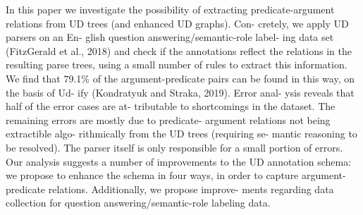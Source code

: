 In this paper we investigate the possibility of extracting predicate-argument relations from UD trees (and enhanced UD graphs). Con- cretely, we apply UD parsers on an En- glish question answering/semantic-role label- ing data set (FitzGerald et al., 2018) and check if the annotations reflect the relations in the resulting parse trees, using a small number of rules to extract this information. We find that 79.1\% of the argument-predicate pairs can be found in this way, on the basis of Ud- ify (Kondratyuk and Straka, 2019). Error anal- ysis reveals that half of the error cases are at- tributable to shortcomings in the dataset. The remaining errors are mostly due to predicate- argument relations not being extractible algo- rithmically from the UD trees (requiring se- mantic reasoning to be resolved). The parser itself is only responsible for a small portion of errors. Our analysis suggests a number of improvements to the UD annotation schema: we propose to enhance the schema in four ways, in order to capture argument-predicate relations. Additionally, we propose improve- ments regarding data collection for question answering/semantic-role labeling data.
